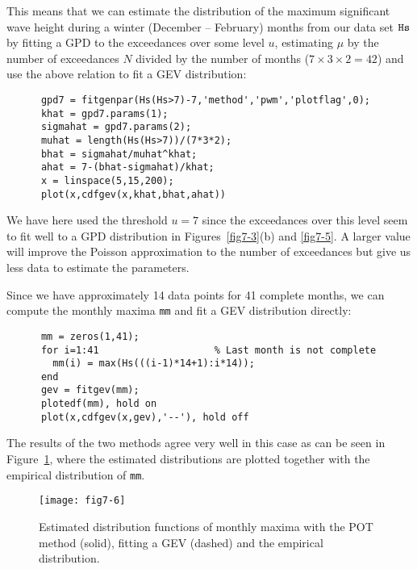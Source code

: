 This means that we can estimate the distribution of
the maximum significant wave
height during a winter (December -- February) months  from our data
set ${\tt Hs}$ by fitting a GPD to the exceedances over some level
$u$, estimating ${\mu}$ by the number of exceedances $N$ divided by
the number of months ($7\times 3\times
2=42$) and use the
above relation to fit a GEV distribution:
{\small\begin{verbatim}
      gpd7 = fitgenpar(Hs(Hs>7)-7,'method','pwm','plotflag',0);
      khat = gpd7.params(1);
      sigmahat = gpd7.params(2);
      muhat = length(Hs(Hs>7))/(7*3*2);
      bhat = sigmahat/muhat^khat;
      ahat = 7-(bhat-sigmahat)/khat;
      x = linspace(5,15,200);
      plot(x,cdfgev(x,khat,bhat,ahat))
\end{verbatim}} 
\noindent
We have here used the threshold $u=7$ since the exceedances over this
level seem to fit well to a GPD distribution in Figures~\ref{fig7-3}(b)
and \ref{fig7-5}. A larger value will
improve the Poisson approximation to the number of exceedances but
give us less data to estimate the parameters.

Since we have approximately 14 data points for 41 complete months,
we can compute the monthly maxima {\tt mm} and fit a GEV distribution directly:
{\small\begin{verbatim}
      mm = zeros(1,41);
      for i=1:41                    % Last month is not complete
        mm(i) = max(Hs(((i-1)*14+1):i*14));
      end
      gev = fitgev(mm);
      plotedf(mm), hold on
      plot(x,cdfgev(x,gev),'--'), hold off
\end{verbatim}}

The results of the two methods agree very well in this case
as can be seen in Figure~\ref{fig7-6}, where the estimated
distributions are plotted
together with the empirical distribution of {\tt mm}.

\begin{figure}
  \centering
\texttt{[image: fig7-6]}
\vspace{-3mm}
  \caption[Distribution functions of monthly maxima]
{Estimated distribution functions of monthly maxima with the
    POT method (solid), fitting a GEV (dashed) and the empirical distribution.}
  \label{fig7-6}
\end{figure}


